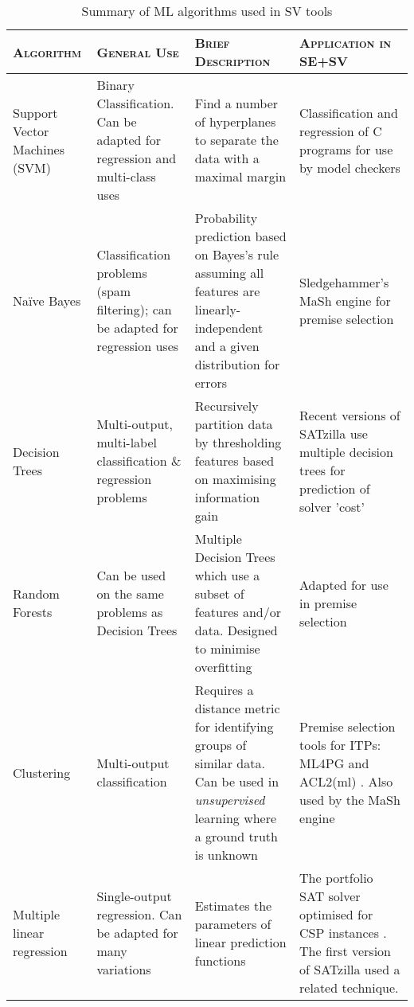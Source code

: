 \begin{table}
	\caption[Summary of ML algorithms used in SV tools]{Summary of ML algorithms used in SV tools}
	\begin{adjustbox}{angle=90}  
		\begin{tabularx}{0.9\textheight}{@{}Y|Y|Y|Y@{}}
			\toprule
			\textsc{Algorithm} & \textsc{General Use} &  \textsc{Brief Description} & \textsc{Application in SE+SV} \\
			\midrule
			\midrule
			Support Vector Machines (SVM) & Binary Classification. Can be adapted for regression and multi-class uses & Find a number of hyperplanes to separate the data with a maximal margin & Classification and regression of C programs for use by model checkers \cite{MUX,DPVZ15:CAV} \\ 
			\midrule
			Na{\"i}ve Bayes & Classification problems (spam filtering); can be adapted for regression uses  & Probability prediction based on Bayes's rule assuming all features are linearly-independent and a given distribution for errors & Sledgehammer's MaSh engine for premise selection \cite{Sledgehammer} \\
			\midrule
			Decision Trees & Multi-output, multi-label classification \& regression problems & Recursively partition data by thresholding features based on maximising information gain & Recent versions of SATzilla \cite{SATzilla2012} use multiple decision trees for prediction of solver 'cost' \\
			\midrule
			Random Forests & Can be used on the same problems as Decision Trees & Multiple Decision Trees which use a subset of features and/or data. Designed to minimise overfitting & Adapted for use in premise selection \cite{Farber2015} \\
			\midrule
			Clustering & Multi-output classification & Requires a distance metric for identifying groups of similar data. Can be used in \textit{unsupervised} learning where a ground truth is unknown & Premise selection tools for ITPs: ML4PG \cite{ML4PG} and ACL2(ml) \cite{Heras2013}. Also used by the MaSh engine \cite{Sledgehammer} \\ 
			\midrule
			Multiple linear regression & Single-output regression. Can be adapted for many variations & Estimates the parameters of linear prediction functions & The portfolio SAT solver optimised for CSP instances \cite{Hurley2014}. The first version of SATzilla \cite{Satzilla} used a related technique. \\
			\bottomrule	
			
		\end{tabularx}
	\end{adjustbox}
	\label{table:algorithms}
\end{table}



